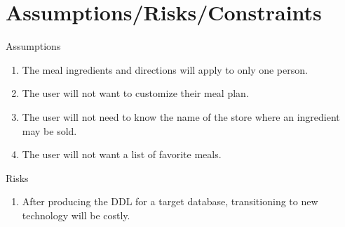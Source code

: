 \documentclass[a4paper,10pt,toc=graduated]{article}
\begin{document}
\section{Assumptions/Risks/Constraints}
\begin{mySubsection}{Assumptions}
\begin{enumerate}
\item The meal ingredients and directions will apply to only one person.
\item The user will not want to customize their meal plan.
\item The user will not need to know the name of the store where an ingredient may be sold.
\item The user will not want a list of favorite meals.
\end{enumerate}
\end{mySubsection}
\begin{mySubsection}{Risks}
\begin{enumerate}
\item After producing the DDL for a target database, transitioning to new technology will be costly.
\end{enumerate}
\end{mySubsection}
\end{document}
